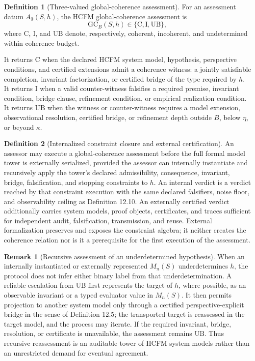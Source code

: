\documentclass[11pt]{article}
\theoremstyle{definition}
\newtheorem{definition}{Definition}
\newtheorem{remark}{Remark}
\begin{document}
\begin{definition}[Three-valued global-coherence assessment]
For an assessment datum $A_0(S, h)$, the HCFM global-coherence assessment is
\begin{equation}
\mathrm{GC}_B(S, h) \in \{\mathrm{C}, \mathrm{I}, \mathrm{UB}\}, \tag{S32c}
\end{equation}
where $\mathrm{C}$, $\mathrm{I}$, and $\mathrm{UB}$ denote, respectively, coherent, incoherent, and undetermined within coherence budget.

It returns $\mathrm{C}$ when the declared HCFM system model, hypothesis, perspective conditions, and certified extensions admit a coherence witness: a jointly satisfiable completion, invariant factorization, or certified bridge of the type required by $h$. It returns $\mathrm{I}$ when a valid counter-witness falsifies a required premise, invariant condition, bridge clause, refinement condition, or empirical realization condition. It returns $\mathrm{UB}$ when the witness or counter-witness requires a model extension, observational resolution, certified bridge, or refinement depth outside $B$, below $\eta$, or beyond $\kappa$.
\end{definition}

\begin{definition}[Internalized constraint closure and external certification]
An assessor may execute a global-coherence assessment before the full formal model tower is externally serialized, provided the assessor can internally instantiate and recursively apply the tower's declared admissibility, consequence, invariant, bridge, falsification, and stopping constraints to $h$. An internal verdict is a verdict reached by that constraint execution with the same declared falsifiers, noise floor, and observability ceiling as Definition 12.10. An externally certified verdict additionally carries system models, proof objects, certificates, and traces sufficient for independent audit, falsification, transmission, and reuse. External formalization preserves and exposes the constraint algebra; it neither creates the coherence relation nor is it a prerequisite for the first execution of the assessment.
\end{definition}

\begin{remark}[Recursive assessment of an underdetermined hypothesis]
When an internally instantiated or externally represented $M_n(S)$ underdetermines $h$, the protocol does not infer either binary label from that underdetermination. A reliable escalation from $\mathrm{UB}$ first represents the target of $h$, where possible, as an observable invariant or a typed evaluator value in $M_n(S)$. It then permits projection to another system model only through a certified perspective-explicit bridge in the sense of Definition 12.5; the transported target is reassessed in the target model, and the process may iterate. If the required invariant, bridge, resolution, or certificate is unavailable, the assessment remains $\mathrm{UB}$. Thus recursive reassessment is an auditable tower of HCFM system models rather than an unrestricted demand for eventual agreement.
\end{remark}
\end{document}
